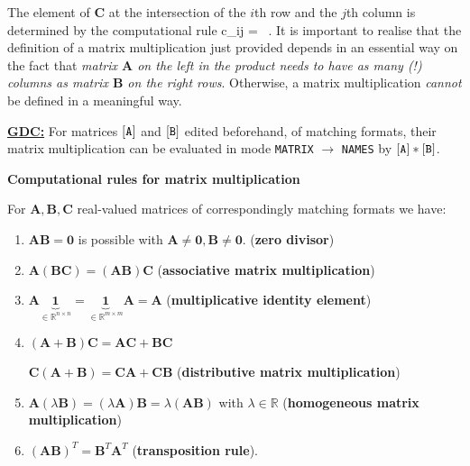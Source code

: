 \medskip
\noindent
The element of $\mathbf{C}$ at the intersection of the $i$th row 
and the $j$th column is determined by the computational rule
%
\be
c_{ij} =  \ .
\ee
%
It is important to realise that the definition of a matrix 
multiplication just provided depends in an essential way on the 
fact that \emph{matrix $\mathbf{A}$ on the left in the product 
needs to have as many (!) columns as matrix $\mathbf{B}$ on the 
right rows}. Otherwise, a matrix multiplication \emph{cannot} be 
defined in a meaningful way.

\medskip
\noindent
\underline{\bf GDC:} For matrices ${\tt [A]}$ and ${\tt [B]}$ 
edited beforehand, of matching formats, their matrix 
multiplication can be evaluated in mode {\tt MATRIX} $\rightarrow$ 
{\tt NAMES} by ${\tt [A]*[B]}$.

\vspace{5mm}
\noindent
{\bf Computational rules for matrix multiplication}

\noindent
For $\mathbf{A}, \mathbf{B}, \mathbf{C}$ real-valued matrices of 
correspondingly matching formats we have:

\begin{enumerate}
	\item $\mathbf{A}\mathbf{B} = \mathbf{0}$ is possible with $\mathbf{A}\neq\mathbf{0},\mathbf{B}\neq\mathbf{0}$.
	\hfill ({\bf zero divisor})
	\item $\mathbf{A}(\mathbf{B}\mathbf{C})
	= (\mathbf{A}\mathbf{B})\mathbf{C}$
	\hfill ({\bf associative matrix multiplication})
	\item $\mathbf{A}
	\underbrace{\mathbf{1}}_{\in \mathbb{R}^{n \times n}}
	=\underbrace{\mathbf{1}}_{\in \mathbb{R}^{m \times m}}
	\mathbf{A}=\mathbf{A}$
	\hfill ({\bf multiplicative identity element})
	\item $(\mathbf{A}+\mathbf{B})\mathbf{C}
	= \mathbf{A}\mathbf{C}+\mathbf{B}\mathbf{C}$
	
	$\mathbf{C}(\mathbf{A}+\mathbf{B})
	= \mathbf{C}\mathbf{A}+\mathbf{C}\mathbf{B}$
	\hfill ({\bf distributive matrix multiplication})
	\item $\mathbf{A}(\lambda\mathbf{B})
	=(\lambda\mathbf{A})\mathbf{B}
	=\lambda(\mathbf{A}\mathbf{B})$
	with $\lambda \in \mathbb{R}$ 
	\hfill ({\bf homogeneous matrix multiplication})
	\item $(\mathbf{A}\mathbf{B})^{T}
	=\mathbf{B}^{T}\mathbf{A}^{T}$
	\hfill ({\bf transposition rule}).
\end{enumerate}

